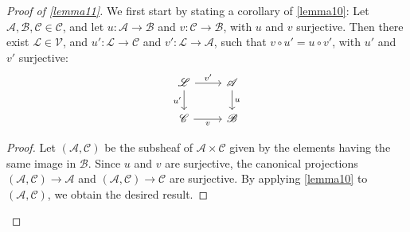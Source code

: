 \documentclass{article}
\theoremstyle{plain}
\newenvironment{lemma}[1]
    {\renewcommand\theinnercustomlemma{#1}\innercustomlemma}
    {\endinnercustomlemma}
\theoremstyle{definition}
\newcommand{\sh}[1]{{\mathscr{#1}}}
\newcommand{\cat}[1]{{\mathcal{#1}}}
\begin{document}
\begin{proof}[Proof of \cref{lemma11}]
  We first start by stating a corollary of \cref{lemma10}:
  \begin{lemma}{13}
  \label{lemma13}
    Let $\sh{A},\sh{B},\sh{C}\in\cat{C}$, and let $u\colon\sh{A}\to\sh{B}$ and $v\colon\sh{C}\to\sh{B}$, with $u$ and $v$ surjective.
    Then there exist $\sh{L}\in\cat{V}$, and $u'\colon\sh{L}\to\sh{C}$ and $v'\colon\sh{L}\to\sh{A}$, such that $v\circ u'=u\circ v'$, with $u'$ and $v'$ surjective:
    \[
      \begin{tikzcd}
        \sh{L} \ar[r,"v'"] \ar[d,swap,"u'"]
        & \sh{A} \ar[d,"u"]
      \\\sh{C} \ar[r,swap,"v"]
        & \sh{B}
      \end{tikzcd}
    \]
  \end{lemma}

  \begin{proof}
    Let $(\sh{A},\sh{C})$ be the subsheaf of $\sh{A}\times\sh{C}$ given by the elements having the same image in $\sh{B}$.
    Since $u$ and $v$ are surjective, the canonical projections $(\sh{A},\sh{C})\to\sh{A}$ and $(\sh{A},\sh{C})\to\sh{C}$ are surjective.
    By applying \cref{lemma10} to $(\sh{A},\sh{C})$, we obtain the desired result.
  \end{proof}


\end{proof}
\end{document}
